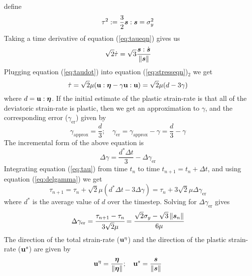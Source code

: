   define
  \begin{equation}\label{eq:taueqn}
    \tau^2 := \frac{3}{2} \Bs:\Bs = \sigma_y^2
  \end{equation}
  Taking a time derivative of equation (\ref{eq:taueqn}) gives us
  \begin{equation}\label{eq:taudot}
    \sqrt{2} \dot{\tau} = \sqrt{3} \frac{\Bs:\dot{\Bs}}{\norm{\Bs}}
  \end{equation}
  Plugging equation (\ref{eq:taudot}) into equation (\ref{eq:stresseqn})$_2$
  we get
  \begin{equation}\label{eq:tau}
    \dot{\tau} = \sqrt{2}\mu(\Bu:\Beta - \gamma\Bu:\Bu)
               = \sqrt{2} \mu (d - 3\gamma)
  \end{equation}
  where $d = \Bu:\Beta$.  If the initial estimate of the plastic strain-rate
  is that all of the deviatoric strain-rate is plastic, then we get an
  approximation to $\gamma$, and the corresponding error
  ($\gamma_{\text{er}}$) given by
  \begin{equation}\label{eq:gammaer}
    \gamma_{\text{approx}} = \frac{d}{3}; \quad
    \gamma_{\text{er}} = \gamma_{\text{approx}} - \gamma = \frac{d}{3} - \gamma
  \end{equation}
  The incremental form of the above equation is
  \begin{equation}\label{eq:delgamma}
    \Delta\gamma = \frac{d^*\Delta t}{3} - \Delta\gamma_{\text{er}}
  \end{equation}
  Integrating equation (\ref{eq:tau}) from time $t_n$ to time $t_{n+1} = 
  t_n + \Delta t$, and using equation (\ref{eq:delgamma}) we get
  \begin{equation}\label{eq:taun}
    \tau_{n+1} = \tau_n + \sqrt{2}\mu(d^*\Delta t - 3\Delta\gamma)
               = \tau_n + 3\sqrt{2}\mu\Delta\gamma_{\text{er}}
  \end{equation}
  where $d^*$ is the average value of $d$ over the timestep.
  Solving for $\Delta\gamma_{\text{er}}$ gives
  \begin{equation}\label{eq:delgammaer}
    \Delta\gamma_{\text{er}} = \cfrac{\tau_{n+1} - \tau_n}{3\sqrt{2}\mu}
      = \cfrac{\sqrt{2}\sigma_y - \sqrt{3}\norm{\Bs_n}}{6\mu}
  \end{equation}
  The direction of the total strain-rate ($\Bu^{\eta}$) and the
  direction of the plastic strain-rate ($\Bu^s$) are given by
  \begin{equation}
    \Bu^{\eta} = \frac{\Beta}{\norm{\Beta}} ; \quad
    \Bu^{s} = \frac{\Bs}{\norm{\Bs}} 
  \end{equation}
